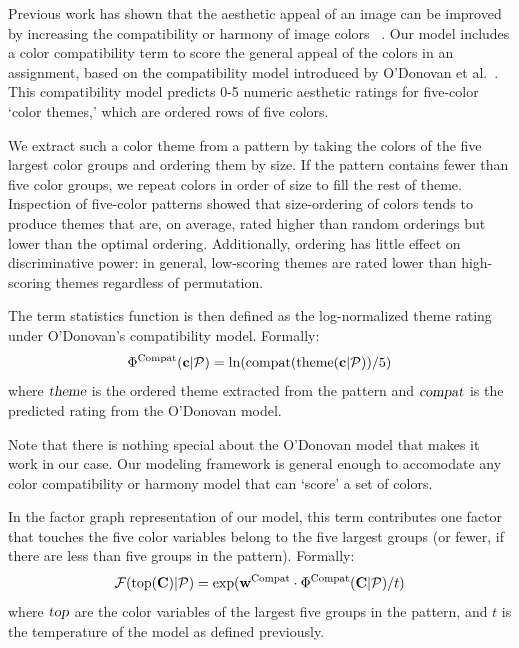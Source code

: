 Previous work has shown that the aesthetic appeal of an image can be improved by increasing the compatibility or harmony of image colors ~\cite{CohenOrHarmonization,DressUp,ColorizationUsingHarmony,ODonovan}. Our model includes a color compatibility term to score the general appeal of the colors in an assignment, based on the compatibility model introduced by O'Donovan et al.~. This compatibility model predicts 0-5 numeric aesthetic ratings for five-color `color themes,' which are ordered rows of five colors. 

We extract such a color theme from a pattern by taking the colors of the five largest color groups and ordering them by size. If the pattern contains fewer than five color groups, we repeat colors in order of size to fill the rest of theme. Inspection of five-color patterns showed that size-ordering of colors tends to produce themes that are, on average, rated higher than random orderings but lower than the optimal ordering. Additionally, ordering has little effect on discriminative power: in general, low-scoring themes are rated lower than high-scoring themes regardless of permutation.

The term statistics function is then defined as the log-normalized theme rating under O'Donovan's compatibility model. Formally:
\begin{equation*}
\Phi^{\textrm{Compat}}(\mathbf{c}| \mathcal{P}) = \ln(\textrm{compat}(\textrm{theme}(\mathbf{c}| \mathcal{P}))/5)
\end{equation*}
where $\textsl{theme}$ is the ordered theme extracted from the pattern and $\textsl{compat}$ is the predicted rating from the O'Donovan model.

Note that there is nothing special about the O'Donovan model that makes it work in our case. Our modeling framework is general enough to accomodate any color compatibility or harmony model that can `score' a set of colors.

In the factor graph representation of our model, this term contributes one factor that touches the five color variables belong to the five largest groups (or fewer, if there are less than five groups in the pattern). Formally:
\begin{equation*}
\mathcal{F}(\textrm{top}(\mathbf{C}) | \mathcal{P}) = \exp(\mathbf{w}^{\textrm{Compat}} \cdot \Phi^{\textrm{Compat}}(\mathbf{C} | \mathcal{P}) / t)
\end{equation*}
where $\textsl{top}$ are the color variables of the largest five groups in the pattern, and $t$ is the temperature of the model as defined previously.

